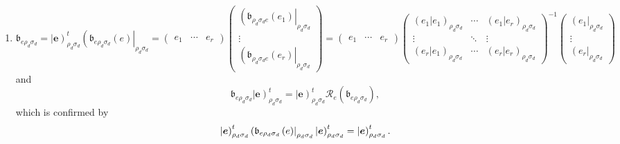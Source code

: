 \documentclass[aps,preprint]{revtex4}
\begin{document}
\begin{enumerate}
\begin{enumerate}
\item 
\begin{equation}
\mathfrak{b}_{e\rho _{d}\sigma _{d}}=\left\vert \boldsymbol{e}\right) _{\rho
_{d}\sigma _{d}}^{t}\left( \mathfrak{b}_{e\rho _{d}\sigma _{d}}\left(
e\right) \right\vert _{\rho _{d}\sigma _{d}}=\left( 
\begin{array}{ccc}
e_{1} & \cdots & e_{r}%
\end{array}%
\right) \left( 
\begin{array}{c}
\left( \mathfrak{b}_{\rho _{d}\sigma _{d}e}\left( e_{1}\right) \right\vert
_{\rho _{d}\sigma _{d}} \\ 
\vdots \\ 
\left( \mathfrak{b}_{\rho _{d}\sigma _{d}e}\left( e_{r}\right) \right\vert
_{\rho _{d}\sigma _{d}}%
\end{array}%
\right) =\left( 
\begin{array}{ccc}
e_{1} & \cdots & e_{r}%
\end{array}%
\right) \left( 
\begin{array}{ccc}
\left( \left. e_{1}\right\vert e_{1}\right) _{\rho _{d}\sigma _{d}} & \cdots
& \left( \left. e_{1}\right\vert e_{r}\right) _{\rho _{d}\sigma _{d}} \\ 
\vdots & \ddots & \vdots \\ 
\left( \left. e_{r}\right\vert e_{1}\right) _{\rho _{d}\sigma _{d}} & \cdots
& \left( \left. e_{r}\right\vert e_{r}\right) _{\rho _{d}\sigma _{d}}%
\end{array}%
\right) ^{\boldsymbol{-}1}\left( 
\begin{array}{c}
\left( e_{1}\right\vert _{\rho _{d}\sigma _{d}} \\ 
\vdots \\ 
\left( e_{r}\right\vert _{\rho _{d}\sigma _{d}}%
\end{array}%
\right)
\end{equation}%
and 
\begin{equation}
\mathfrak{b}_{e\rho _{d}\sigma _{d}}\left\vert \boldsymbol{e}\right) _{\rho
_{d}\sigma _{d}}^{t}=\left\vert \boldsymbol{e}\right) _{\rho _{d}\sigma
_{d}}^{t}\mathcal{R}_{e}\left( \mathfrak{b}_{e\rho _{d}\sigma _{d}}\right) ,
\end{equation}%
which is confirmed by 
\begin{equation}
\left\vert \boldsymbol{e}\right) _{\rho _{d}\sigma _{d}}^{t}\left( \mathfrak{%
b}_{e\rho _{d}\sigma _{d}}\left( e\right) \right\vert _{\rho _{d}\sigma
_{d}}\left\vert \boldsymbol{e}\right) _{\rho _{d}\sigma _{d}}^{t}=\left\vert 
\boldsymbol{e}\right) _{\rho _{d}\sigma _{d}}^{t}.
\end{equation}


\end{enumerate}
\end{enumerate}
\end{document}
